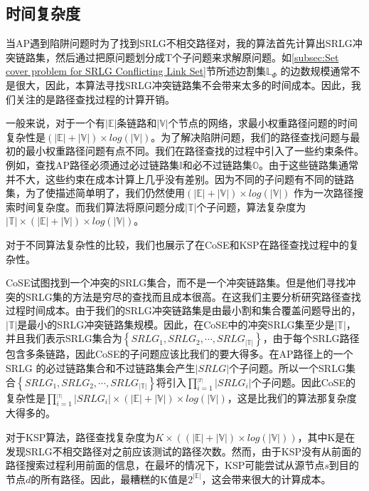 \subsection{时间复杂度}
\label{subsec:Complexity analysis}
当AP遇到陷阱问题时为了找到SRLG不相交路径对，我的算法首先计算出SRLG冲突链路集，然后通过把原问题划分成T个子问题来求解原问题。如\ref{subsec:Set cover problem for SRLG Conflicting Link Set}节所述边割集$\mathbb{L}_{\Phi}$ 的边数规模通常不是很大，因此，本算法寻找SRLG冲突链路集不会带来太多的时间成本。因此，我们关注的是路径查找过程的计算开销。

一般来说，对于一个有$|\mathbb{E}|$条链路和$|\mathbb{V}|$个节点的网络，求最小权重路径问题的时间复杂性是$(|\mathbb{E}|+|\mathbb{V}|)\times log(|\mathbb{V}|)$。为了解决陷阱问题，我们的路径查找问题与最初的最小权重路径问题有点不同。我们在路径查找的过程中引入了一些约束条件。例如，查找AP路径必须通过必过链路集$\mathbb{I}$和必不过链路集$\mathbb{O}$。由于这些链路集通常并不大，这些约束在成本计算上几乎没有差别。因为不同的子问题有不同的链路集，为了使描述简单明了，我们仍然使用$(|\mathbb{E}|+|\mathbb{V}|)\times log(|\mathbb{V}|)$ 作为一次路径搜索时间复杂度。而我们算法将原问题分成$|\mathbb{T}|$个子问题，算法复杂度为$|\mathbb{T}|\times(|\mathbb{E}|+|\mathbb{V}|)\times log(|\mathbb{V}|)$。


对于不同算法复杂性的比较，我们也展示了在CoSE\cite{rostami2007cose}和KSP\cite{eppstein1998finding}在路径查找过程中的复杂性。

CoSE试图找到一个冲突的SRLG集合，而不是一个冲突链路集。但是他们寻找冲突的SRLG集的方法是穷尽的查找而且成本很高。在这我们主要分析研究路径查找过程时间成本。由于我们的SRLG冲突链路集是由最小割和集合覆盖问题导出的，$|\mathbb{T}|$是最小的SRLG冲突链路集规模。因此，在CoSE中的冲突SRLG集至少是$|\mathbb{T}|$，并且我们表示SRLG集合为$\left\{ {SRL{G_1},SRL{G_2}, \cdots ,SRL{G_{|\mathbb{T}|}}} \right\}$，由于每个SRLG路径包含多条链路，因此CoSE的子问题应该比我们的要大得多。在AP路径上的一个SRLG 的必过链路集合和不过链路集会产生$|SRLG|$个子问题。所以一个SRLG集合$\left\{ {SRL{G_1},SRL{G_2}, \cdots ,SRL{G_{|\mathbb{T}|}}} \right\}$将引入$\prod\limits_{i = 1}^{_{\left| T \right|}} {\left| {SRL{G_i}} \right|}$个子问题。因此CoSE的复杂性是$\prod\limits_{i = 1}^{_{|\mathbb{T}|}} {\left| {SRL{G_i}} \right|}\times (|\mathbb{E}|+|\mathbb{V}|)\times log(|\mathbb{V}|)$，这是比我们的算法那复杂度大得多的。

对于KSP算法\cite{eppstein1998finding}，路径查找复杂度为$K\times ((|\mathbb{E}|+|\mathbb{V}|)\times log(|\mathbb{V}|))$，其中K是在发现SRLG不相交路径对之前应该测试的路径次数。然而，由于KSP没有从前面的路径搜索过程利用前面的信息，在最坏的情况下，KSP可能尝试从源节点$s$到目的节点$d$的所有路径。因此，最糟糕的K值是$2^{|\mathbb{E}|}$，这会带来很大的计算成本。
